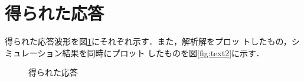 \documentclass[a4paper,12pt]{jarticle}
\begin{document}
\section{得られた応答}
%
得られた応答波形を図\ref{fig:output}にそれぞれ示す．また，解析解をプロッ
トしたもの，シミュレーション結果を同時にプロット
したものを図\ref{fig:text2}に示す．
%
\begin{figure}[htbp]
  \begin{center} 
  \hfill
  \end{center}
  \caption{得られた応答}
  \label{fig:output}
\end{figure}
%
\end{document}
